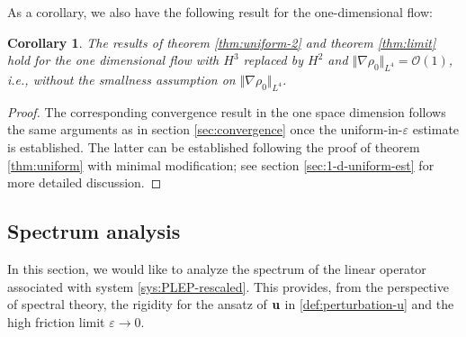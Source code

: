 \documentclass[11pt]{article}
\theoremstyle{plain}
\newtheorem{corollary}[theorem]{Corollary}
\theoremstyle{definition}
\theoremstyle{remark}
\renewcommand{\vec}[1]{{\bf #1}}
\newcommand{\norm}[2]{\Vert #1 \Vert_{#2}}
\numberwithin{equation}{section}
\begin{document}
As a corollary, we also have the following result for the one-dimensional flow:
\begin{corollary}
    \label{cor:1-d}
    The results of theorem \ref{thm:uniform-2} and theorem \ref{thm:limit} hold for the one dimensional flow with $ H^3 $ replaced by $ H^2 $ and $ \norm{\nabla \rho_0}{L^4} = \mathcal O(1) $, i.e., without the smallness assumption on $ \norm{\nabla\rho_0}{L^4} $. 
\end{corollary}

\begin{proof}
    The corresponding convergence result in the one space dimension follows the same arguments as in section \ref{sec:convergence} once the uniform-in-$\varepsilon$ estimate is established. The latter can be established following the proof of theorem \ref{thm:uniform} with minimal modification; see section \ref{sec:1-d-uniform-est} for more detailed discussion. 
\end{proof}






\subsection{Spectrum analysis}
\label{sec:spectrum}
In this section, we would like to analyze the spectrum of the linear operator associated with system \eqref{sys:PLEP-rescaled}. This provides, from the perspective of spectral theory, the rigidity for the ansatz of $ \vec u $ in \eqref{def:perturbation-u} and the high friction limit $ \varepsilon\rightarrow 0 $. 
\end{document}
